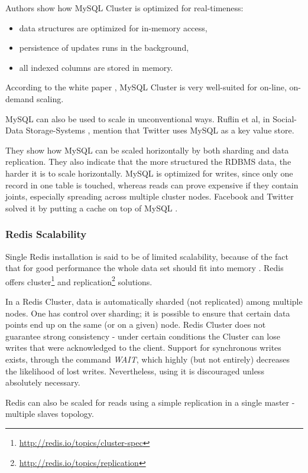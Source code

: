 \documentclass{uvamscse}
\begin{document}
Authors show how MySQL Cluster is optimized for real-timeness:
\begin{itemize}
  \item data structures are optimized for in-memory access,
  \item persistence of updates runs in the background,
  \item all indexed columns are stored in memory.
\end{itemize}
According to the white paper \cite{MySQL}, MySQL Cluster is very well-suited for on-line, on-demand scaling.

MySQL can also be used to scale in unconventional ways. Ruflin et al, in Social-Data Storage-Systems \cite{SoDaSS}, mention that Twitter uses MySQL as a key value store.

They show how MySQL can be scaled horizontally by both sharding and data replication. They also indicate that the more structured the RDBMS data, the harder it is to scale horizontally. MySQL is optimized for writes, since only one record in one table is touched, whereas reads can prove expensive if they contain joints, especially spreading across multiple cluster nodes. Facebook and Twitter solved it by putting a cache on top of MySQL \cite{SoDaSS}.

\subsubsection{Redis Scalability}
Single Redis installation is said to be of limited scalability, because of the fact that for good performance the whole data set should fit into memory \cite{SoDaSS}. Redis offers cluster\footnote{\url{http://redis.io/topics/cluster-spec}} and replication\footnote{\url{http://redis.io/topics/replication}} solutions.

In a Redis Cluster, data is automatically sharded (not replicated) among multiple nodes. One has control over sharding; it is possible to ensure that certain data points end up on the same (or on a given) node. Redis Cluster does not guarantee strong consistency - under certain conditions the Cluster can lose writes that were acknowledged to the client. Support for synchronous writes exists, through the command \textit{WAIT}, which highly (but not entirely) decreases the likelihood of lost writes. Nevertheless, using it is discouraged unless absolutely necessary.

Redis can also be scaled for reads using a simple replication in a single master - multiple slaves topology.
\end{document}
